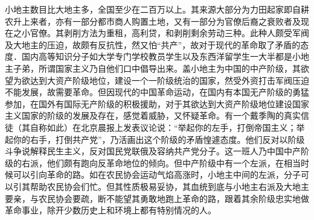 小地主数目比大地主多，全国至少在二百万以上。其来源大部分为力田起家即自耕农升上来者，亦有一部分都市商人购置土地，又有一部分为官僚后裔之衰败者及现在之小官僚。其剥削方法为重租，高利贷，和剥削剩余劳动三种。此种人颇受军阀及大地主的压迫，故颇有反抗性，然又怕“共产”，故对于现代的革命取了矛盾的态度．国内高等知识分子如大学专门学校教员学生以及东西洋留学生一大半都是小地主子弟，所谓国家主义乃自他们口中倡导出来。盖小地主为中国的中产阶级，其欲望为欲达到大资产阶级地位，建设一个一阶级统治的国家，然受外资打击军阀压迫不能发展，故需要革命。但因现代的中国革命运动，在国内有本国无产阶级的勇猛参加，在国外有国际无产阶级的积极援助，对于其欲达到大资产阶级地位建设国家主义国家的阶级的发展及存在，感觉着威胁，又怀疑革命。有一个戴季陶的真实信徒（其自称如此）在北京晨报上发表议论说：“举起你的左手，打倒帝国主义；举起你的右手，打倒共产党”，乃活画出这个阶级的矛盾惶遽态度。他们反对以阶级斗争说解释民生主义，反对国民党联俄及容纳共产党分子。这一班人乃中国中产阶级的右派，他们颇有跑向反革命地位的倾向。但中产阶级中有一个左派，在相当时候可以引向革命的路。如在农民协会运动气焰高涨时，小地主中间的左派，分子可以引其帮助农民协会们忙。但其性质极易妥协，其血统到底与小地主右派及大地主要亲，与农民协会要疏，断不能望其勇敢地跑上革命的路，跟着其余阶级忠实地做革命事业，除开少数历史上和环境上都有特别情况的人。

